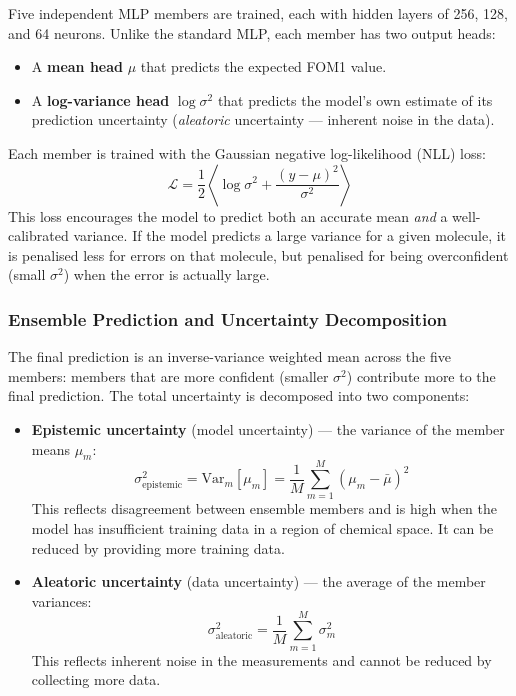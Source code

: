 \documentclass[11pt,a4paper]{article}
\begin{document}
Five independent MLP members are trained, each with hidden layers of 256, 128, and 64 neurons. Unlike the standard MLP, each member has two output heads:
\begin{itemize}
    \item A \textbf{mean head} $\mu$ that predicts the expected FOM1 value.
    \item A \textbf{log-variance head} $\log \sigma^2$ that predicts the model's own estimate of its prediction uncertainty (\emph{aleatoric} uncertainty --- inherent noise in the data).
\end{itemize}

Each member is trained with the Gaussian negative log-likelihood (NLL) loss:
\begin{equation}
    \mathcal{L} = \frac{1}{2} \left\langle \log \sigma^2 + \frac{(y - \mu)^2}{\sigma^2} \right\rangle
\end{equation}
This loss encourages the model to predict both an accurate mean \emph{and} a well-calibrated variance. If the model predicts a large variance for a given molecule, it is penalised less for errors on that molecule, but penalised for being overconfident (small $\sigma^2$) when the error is actually large.

\subsubsection*{Ensemble Prediction and Uncertainty Decomposition}

The final prediction is an inverse-variance weighted mean across the five members: members that are more confident (smaller $\sigma^2$) contribute more to the final prediction. The total uncertainty is decomposed into two components:

\begin{itemize}
    \item \textbf{Epistemic uncertainty} (model uncertainty) --- the variance of the member means $\mu_m$:
    \begin{equation}
        \sigma^2_{\text{epistemic}} = \mathrm{Var}_{m}[\mu_m] = \frac{1}{M}\sum_{m=1}^{M}(\mu_m - \bar{\mu})^2
    \end{equation}
    This reflects disagreement between ensemble members and is high when the model has insufficient training data in a region of chemical space. It can be reduced by providing more training data.

    \item \textbf{Aleatoric uncertainty} (data uncertainty) --- the average of the member variances:
    \begin{equation}
        \sigma^2_{\text{aleatoric}} = \frac{1}{M} \sum_{m=1}^{M} \sigma^2_m
    \end{equation}
    This reflects inherent noise in the measurements and cannot be reduced by collecting more data.
\end{itemize}
\end{document}
